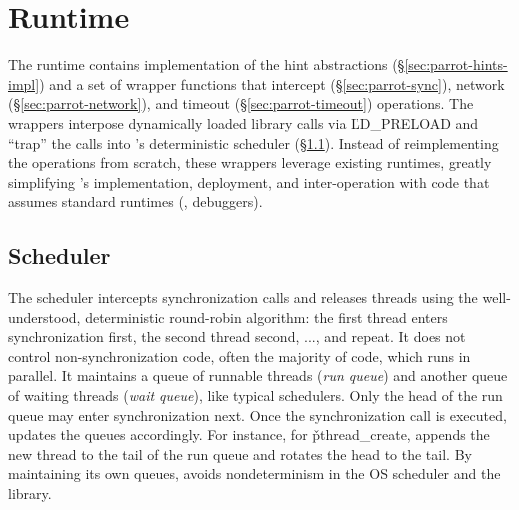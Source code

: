 \section{\parrot Runtime} \label{sec:parrot-runtime}


The \parrot runtime contains implementation of the hint abstractions
(\S\ref{sec:parrot-hints-impl}) and a set of wrapper functions that intercept
\pthread (\S\ref{sec:parrot-sync}), network (\S\ref{sec:parrot-network}), and timeout
(\S\ref{sec:parrot-timeout}) operations.  The wrappers interpose dynamically
loaded library calls via \v{LD\_PRELOAD} and ``trap'' the calls into
\parrot's deterministic scheduler (\S\ref{sec:parrot-scheduler}).  Instead of
reimplementing the operations from scratch, these wrappers leverage
existing runtimes, greatly simplifying \parrot's implementation, deployment,
and inter-operation with code that assumes standard runtimes (\eg,
debuggers).

\subsection{Scheduler} \label{sec:parrot-scheduler}

The scheduler intercepts synchronization calls and releases threads using the
well-understood, deterministic round-robin algorithm: the first thread
enters synchronization first, the second thread second, ..., and
repeat.  It does not control non-synchronization code, often the majority
of code, which runs in parallel.  It maintains a queue
of runnable threads (\emph{run queue}) and another queue of waiting
threads (\emph{wait queue}), like typical schedulers.  Only the head of the
run queue may enter synchronization next. Once the synchronization call is
executed, \parrot updates the queues accordingly.  For instance, for
\v{pthread\_create}, \parrot appends the new thread to the tail of
the run queue and rotates the head to the tail.  By maintaining
its own queues, \parrot avoids nondeterminism in the OS scheduler and
the \pthread library.

